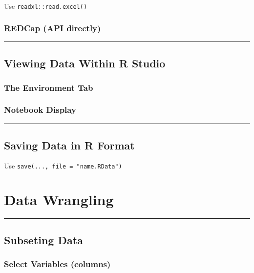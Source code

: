 \documentclass[]{book}
\begin{document}
Use \texttt{readxl::read.excel()}

\subsection{REDCap (API directly)}\label{redcap-api-directly}

\begin{center}\rule{0.5\linewidth}{\linethickness}\end{center}

\section{Viewing Data Within R
Studio}\label{viewing-data-within-r-studio}

\subsection{The Environment Tab}\label{the-environment-tab}

\subsection{Notebook Display}\label{notebook-display}

\begin{center}\rule{0.5\linewidth}{\linethickness}\end{center}

\section{Saving Data in R Format}\label{saving-data-in-r-format}

Use \texttt{save(...,\ file\ =\ "name.RData")}

\chapter{Data Wrangling}\label{data-wrangling}

\begin{center}\rule{0.5\linewidth}{\linethickness}\end{center}

\section{Subseting Data}\label{subseting-data}

\subsection{Select Variables (columns)}\label{select-variables-columns}
\end{document}
